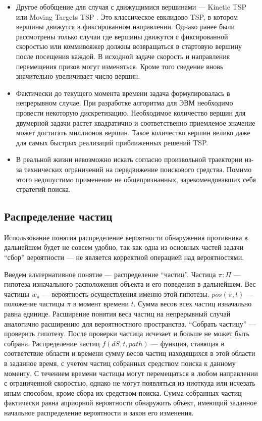 \begin{itemize}
{в том, что значительно увеличивается количество вершин, в частности новая вершина будет
сопоставлена $j$-му моменту, когда приз $q_i$ оказался в вершине $v$.} 
\item{Другое обобщение для случая с движущимися вершинами --- Kinetic TSP \cite{ham99} или
Moving Targets TSP \cite{hel03}.
Это классическое евклидово TSP, в котором вершины движутся в фиксированном направлении.
Однако ранее были рассмотрены только случаи где вершины движутся с фиксированной скоростью или
коммивояжер должны возвращаться в стартовую вершину после посещения каждой. В исходной
задаче скорость и направления перемещения призов могут изменяться. Кроме того сведение вновь
значительно увеличивает число вершин.}
\item{Фактически до текущего момента времени задача формулировалась в непрерывном случае.
При разработке алгоритма для ЭВМ необходимо провести некоторую дискретизацию.
Необходимое количество вершин для двумерной задачи растет квадратично и соответственно
приемлемое значение может достигать миллионов вершин. Такое количество вершин велико
даже для самых быстрых реализаций приближенных решений TSP.}
\item{В реальной жизни невозможно искать согласно произвольной траектории из-за технических
ограничений на передвижение поискового средства. Помимо этого недопустимo применение не
общепризнанных, зарекомендовавших себя стратегий поиска.}
\end{itemize}

\FloatBarrier
\subsection{Распределение частиц}
Использование понятия распределение вероятности обнаружения противника в дальнейшем будет
не совсем удобно, так как одна из основных частей задачи ``сбор'' вероятности --- не является
корректной операцией над вероятностями.

Введем альтернативное понятие --- распределение ``частиц''.
Частица $\pi : \Pi$ --- гипотеза изначального расположения объекта и его поведения в дальнейшем.
Вес частицы $w_{\pi}$ --- вероятность осуществления именно этой гипотезы.
$pos(\pi, t)$ --- положение частицы $\pi$ в момент времени $t$.
Сумма весов всех частиц изначально равна единице. Расширение понятия веса частиц на непрерывный
 случай аналогично расширению для вероятностного пространства.
``Собрать частицу'' --- проверить гипотезу. После проверки частица исчезает и больше не может
быть собрана.
Распределение частиц $f(dS, t, path)$ --- функция, ставящая в соответствие области и
 времени сумму весов частиц находящихся в этой области в заданное время,
 с учетом частиц собранных средством поиска к данному моменту. 
С течением времени частицы могут перемещаться в любом направлении с ограниченной скоростью, однако
не могут появляться из ниоткуда или исчезать иным способом, кроме сбора их средством поиска.
Сумма собранных частиц фактически равна априорной вероятности обнаружить объект, имеющий заданное
начальное распределение вероятности и закон его изменения.

